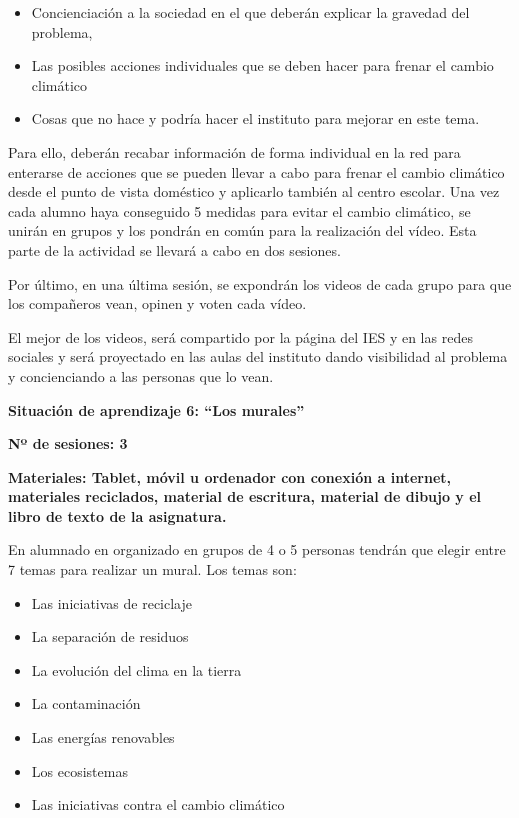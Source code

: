 \documentclass[
]{article}
\providecommand{\tightlist}{%
  \setlength{\itemsep}{0pt}\setlength{\parskip}{0pt}}
\begin{document}
\begin{itemize}
\tightlist
\item
  Concienciación a la sociedad en el que deberán explicar la gravedad
  del problema,
\item
  Las posibles acciones individuales que se deben hacer para frenar el
  cambio climático\\
\item
  Cosas que no hace y podría hacer el instituto para mejorar en este
  tema.
\end{itemize}

Para ello, deberán recabar información de forma individual en la red
para enterarse de acciones que se pueden llevar a cabo para frenar el
cambio climático desde el punto de vista doméstico y aplicarlo también
al centro escolar. Una vez cada alumno haya conseguido 5 medidas para
evitar el cambio climático, se unirán en grupos y los pondrán en común
para la realización del vídeo. Esta parte de la actividad se llevará a
cabo en dos sesiones.

Por último, en una última sesión, se expondrán los videos de cada grupo
para que los compañeros vean, opinen y voten cada vídeo.

El mejor de los videos, será compartido por la página del IES y en las
redes sociales y será proyectado en las aulas del instituto dando
visibilidad al problema y concienciando a las personas que lo vean.

\textbf{Situación de aprendizaje 6: ``Los murales''}

\textbf{Nº de sesiones: 3}

\textbf{Materiales: Tablet, móvil u ordenador con conexión a internet,
materiales reciclados, material de escritura, material de dibujo y el
libro de texto de la asignatura.}

En alumnado en organizado en grupos de 4 o 5 personas tendrán que elegir
entre 7 temas para realizar un mural. Los temas son:

\begin{itemize}
\tightlist
\item
  Las iniciativas de reciclaje
\item
  La separación de residuos
\item
  La evolución del clima en la tierra
\item
  La contaminación
\item
  Las energías renovables
\item
  Los ecosistemas
\item
  Las iniciativas contra el cambio climático
\end{itemize}
\end{document}
